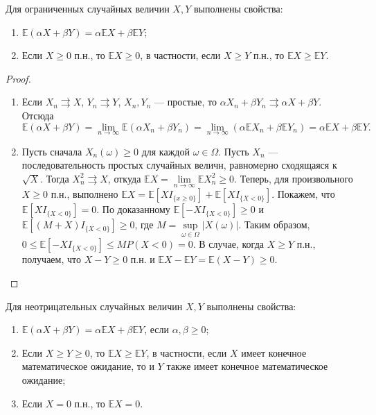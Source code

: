 \begin{proposal*}
    Для ограниченных случайных величин $X, Y$ выполнены свойства:
    \begin{enumerate}
        \item $\mathbb{E}(\alpha X+\beta Y)=\alpha\mathbb{E}X+\beta\mathbb{E}Y$;
        \item Если $X \geqslant 0$ п.н., то $\mathbb{E} X \geqslant 0$, в частности, если $X \geqslant Y$ п.н., то $\mathbb{E} X \geqslant \mathbb{E} Y$.
    \end{enumerate}
\end{proposal*}

\begin{proof}~
    \begin{enumerate}
        \item Если $X_n \rightrightarrows X$, $Y_n \rightrightarrows Y$, $X_n, Y_n$ --- простые, то $\alpha X_n + \beta Y_n \rightrightarrows \alpha X + \beta Y$.
        Отсюда
        \[
            \mathbb{E}(\alpha X + \beta Y) = \lim\limits_{n \to \infty}\mathbb{E}(\alpha X_n + \beta Y_n) = \lim\limits_{n \to \infty}(\alpha \mathbb{E} X_n + \beta \mathbb{E} Y_n) = \alpha \mathbb{E} X + \beta \mathbb{E} Y.
        \]
        \item Пусть сначала $X_n(\omega) \geqslant 0$ для каждой $\omega \in \Omega$.
        Пусть $X_n$ --- последовательность простых случайных величн, равномерно сходящаяся к $\sqrt{X}$.
        Тогда $X_n^2 \rightrightarrows X$, откуда $\mathbb{E}X = \lim\limits_{n \to \infty}\mathbb{E}X_n^2 \geqslant 0$.
        Теперь, для произвольного $X \geqslant 0$ п.н., выполнено $\mathbb{E}X = \mathbb{E}[X I_{\{x \geqslant 0\}}] + \mathbb{E}[X I_{\{X < 0\}}]$.
        Покажем, что $\mathbb{E}[X I_{\{X < 0\}}] = 0$.
        По доказанному $\mathbb{E}[-X I_{\{ X < 0 \}}] \geqslant 0$ и $\mathbb{E}[(M + X) I_{\{X < 0\}}] \geqslant 0$, где $M = \sup\limits_{\omega \in \Omega}|X(\omega)|$.
        Таким образом, $0 \leqslant \mathbb{E}[-X I_{\{ X < 0 \}}] \leqslant M P(X < 0) = 0$.
        В случае, когда $X \geqslant Y$ п.н., получаем, что $X - Y \geqslant 0$ п.н. и $\mathbb{E}X - \mathbb{E}Y = \mathbb{E}(X - Y) \geqslant 0$.
    \end{enumerate}
\end{proof}


\begin{proposal*}
    Для неотрицательных случайных величин $X, Y$ выполнены свойства:
    \begin{enumerate}
        \item $\mathbb{E}(\alpha X + \beta Y) = \alpha\mathbb{E} X + \beta\mathbb{E} Y$, если $\alpha, \beta \geqslant 0$;
        \item Если $X \geqslant Y \geqslant 0$, то $\mathbb{E} X \geqslant \mathbb{E} Y$, в частности, если $X$ имеет конечное математическое ожидание, то и $Y$ также имеет конечное математическое ожидание;
        \item Если $X = 0$ п.н., то $\mathbb{E}X = 0$.
    \end{enumerate}
\end{proposal*}

